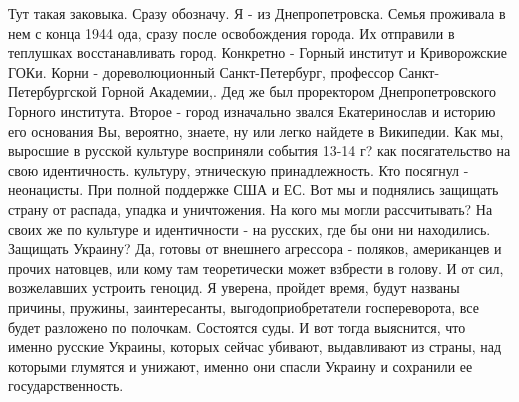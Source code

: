  
 
 
 
 

\begin{cmtfront}
\normalsize{}

Тут такая заковыка. Сразу обозначу. Я - из Днепропетровска. Семья проживала в
нем с конца 1944 ода, сразу после освобождения города. Их отправили в теплушках
восстанавливать город. Конкретно - Горный институт и Криворожские ГОКи. Корни -
дореволюционный Санкт-Петербург, профессор Санкт-Петербургской Горной
Академии,. Дед же был проректором Днепропетровского Горного института. Второе -
город изначально звался Екатеринослав и историю его основания Вы, вероятно,
знаете, ну или легко найдете в Википедии. Как мы, выросшие в русской культуре
восприняли события 13-14 г? как посягательство на свою идентичность. культуру,
этническую принадлежность. Кто посягнул - неонацисты. При полной поддержке США
и ЕС. Вот мы и поднялись защищать страну от распада, упадка и уничтожения. На
кого мы могли рассчитывать? На своих же по культуре и идентичности - на
русских, где бы они ни находились. Защищать Украину? Да, готовы от внешнего
агрессора - поляков, американцев и прочих натовцев, или кому там теоретически
может взбрести в голову. И от сил, возжелавших устроить геноцид. Я уверена,
пройдет время, будут названы причины, пружины, заинтересанты,
выгодоприобретатели госпереворота, все будет разложено по полочкам. Состоятся
суды. И вот тогда выяснится, что именно русские Украины, которых сейчас
убивают, выдавливают из страны, над которыми глумятся и унижают, именно они
спасли Украину и сохранили ее государственность.
	
\end{cmtfront}

